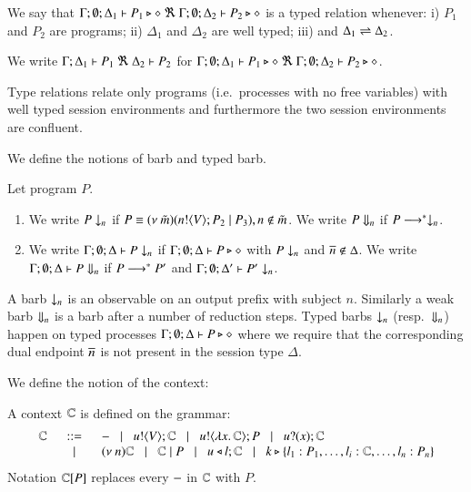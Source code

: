 \begin{definition}\rm
	We say that
	$\Gamma; \emptyset; \Delta_1 \vdash P_1 \triangleright \diamond\ \Re \ \Gamma; \emptyset; \Delta_2 \vdash P_2 \triangleright \diamond$
	is a typed relation whenever:
	i) $P_1$ and $P_2$ are programs;
	ii) $\Delta_1$ and $\Delta_2$ are well typed;
	iii) and $\Delta_1 \rightleftharpoons \Delta_2$.

	We write
	$\horel{\Gamma}{\Delta_1}{P_1}{\ \Re\ }{\Delta_2}{P_2}$
	for $\Gamma; \emptyset; \Delta_1 \vdash P_1 \triangleright \diamond\ \Re\ \Gamma; \emptyset; \Delta_2 \vdash P_2 \triangleright \diamond$.
\end{definition}

Type relations relate only programs (i.e.\ processes with no free variables) with
well typed session environments and furthermore the two session environments
are confluent.

We define the notions of barb and typed barb.

\begin{definition}[Barbs]\rm
	Let program $P$.
	\begin{enumerate}
		\item	We write $P \downarrow_{n}$ if $P \equiv (\nu\ \tilde{m})(n ! \langle V \rangle ; P_2 \;|\; P_3), n \notin \tilde{m}$.
			We write $P \Downarrow_{n}$ if $P \longrightarrow^* \downarrow_{n}$.

		\item	We write $\Gamma; \emptyset; \Delta \vdash P \downarrow_{n}$ if
			$\Gamma; \emptyset; \Delta \vdash P \triangleright \diamond$ with $P \downarrow_{n}$ and $\overline{n} \notin \Delta$.
			We write $\Gamma; \emptyset; \Delta \vdash P \Downarrow_{n}$ if $P \longrightarrow^* P'$ and
			$\Gamma; \emptyset; \Delta' \vdash P' \downarrow_{n}$.			
	\end{enumerate}
\end{definition}

A barb $\downarrow_{n}$ is an observable on an output prefix with subject $n$.
Similarly a weak barb $\Downarrow_{n}$ is a barb after a number of reduction steps.
Typed barbs $\downarrow_{n}$ (resp.\ $\Downarrow_{n}$)
happen on typed processes $\Gamma; \emptyset; \Delta \vdash P \triangleright \diamond$
where we require that the corresponding dual endpoint $\overline{n}$ is not present
in the session type $\Delta$.

We define the notion of the context:

\begin{definition}[Context]\rm
	A context ${\Bbb C}$ is defined on the grammar:
%
\[
	\begin{array}{rcl}
		{\Bbb C} &\;\;::=\;\;& - \;\;\;|\;\;\; u ! \langle V \rangle ; {\Bbb C} \;\;\;|\;\;\; u ! \langle \lambda x.\,{\Bbb C} \rangle ; P \;\;\;|\;\;\; u ? (x) ; {\Bbb C} \\
		& \;\;\;|\;\;\; & (\nu\ n) {\Bbb C} \;\;\;|\;\;\; {\Bbb C} \;|\; P \;\;\;|\;\;\; u \triangleleft l ; {\Bbb C} \;\;\;|\;\;\; k \triangleright \{l_1: P_1, \dots, l_i:{\Bbb C}, \dots, l_n: P_n\}
	\end{array}
\]
%
	Notation ${\Bbb C}[P]$ replaces every $-$ in ${\Bbb C}$ with $P$.
\end{definition}

